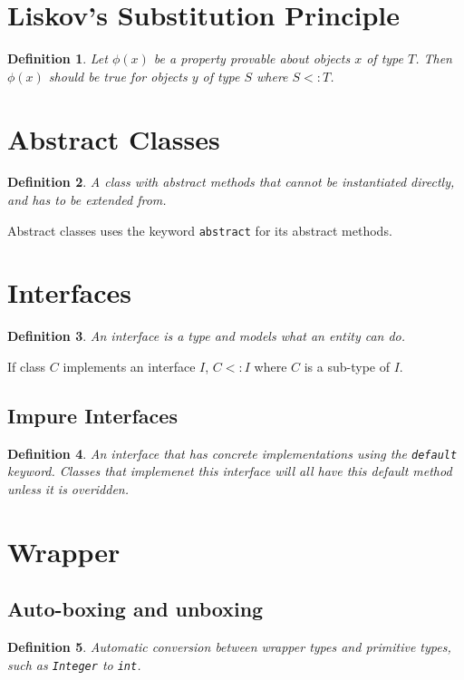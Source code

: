 \documentclass[10pt,landscape,a4paper]{article}
\newtheorem{definition}{Definition}[section]
\begin{document}
\footnotesize
\begin{multicols*}{4}

\section{Liskov's Substitution Principle}
\begin{definition}
    Let $\phi(x)$ be a property provable about objects $x$ of type $T$. Then $\phi(x)$ should be true for objects $y$ of type $S$ where $S<:T$.
\end{definition}

\section{Abstract Classes}
\begin{definition}
    A class with abstract methods that cannot be instantiated directly, and has to be extended from.
\end{definition}
Abstract classes uses the keyword \texttt{abstract} for its abstract methods.

\section{Interfaces}
\begin{definition}
    An interface is a type and models what an entity can do.
\end{definition}
If class $C$ implements an interface $I$, $C<:I$ where $C$ is a sub-type of $I$.

\subsection{Impure Interfaces}
\begin{definition}
    An interface that has concrete implementations using the \texttt{default} keyword. Classes that implemenet this interface will all have this default method unless it is overidden.
\end{definition}


\section{Wrapper}
\subsection{Auto-boxing and unboxing}
\begin{definition}
    Automatic conversion between wrapper types and primitive types, such as \texttt{Integer} to \texttt{int}.
\end{definition}


\end{multicols*}
\end{document}

